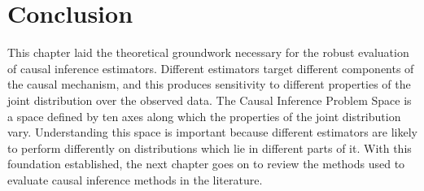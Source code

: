 \documentclass[../main.tex]{subfiles}
\begin{document}
\section{Conclusion}

This chapter laid the theoretical groundwork necessary for the robust evaluation of causal inference estimators. Different estimators target different components of the causal mechanism, and this produces sensitivity to different properties of the joint distribution over the observed data. The Causal Inference Problem Space is a space defined by ten axes along which the properties of the joint distribution vary. Understanding this space is important because different estimators are likely to perform differently on distributions which lie in different parts of it. With this foundation established, the next chapter goes on to review the methods used to evaluate causal inference methods in the literature.
\end{document}
